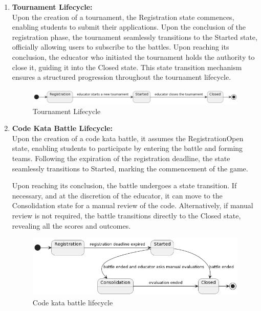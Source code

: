 \begin{enumerate}
    
    \item \textbf{Tournament Lifecycle:} \\
    Upon the creation of a tournament, the Registration state commences, enabling students to submit their applications. Upon the conclusion of the registration phase, the tournament seamlessly transitions to the Started state, officially allowing users to subscribe to the battles. Upon reaching its conclusion, the educator who initiated the tournament holds the authority to close it, guiding it into the Closed state. This state transition mechanism ensures a structured progression throughout the tournament lifecycle.
    
    \begin{figure}[h!]
          \centering
          \includegraphics[width=1\textwidth]{Images/TournamentLifecycle.png}
          \caption{Tournament Lifecycle}
          \label{fig:TournamentLifecycle}
    \end{figure}

    \item \textbf{Code Kata Battle Lifecycle:} \\
    Upon the creation of a code kata battle, it assumes the RegistrationOpen state, enabling students to participate by entering the battle and forming teams. Following the expiration of the registration deadline, the state seamlessly transitions to Started, marking the commencement of the game.

Upon reaching its conclusion, the battle undergoes a state transition. If necessary, and at the discretion of the educator, it can move to the Consolidation state for a manual review of the code. Alternatively, if manual review is not required, the battle transitions directly to the Closed state, revealing all the scores and outcomes.

        \begin{figure}[h!]
              \centering
              \includegraphics[width=1\textwidth]{Images/CKBLifecycle.png}
              \caption{Code kata battle lifecycle}
              \label{fig:CKBLifecycle}
        \end{figure}


\end{enumerate}
